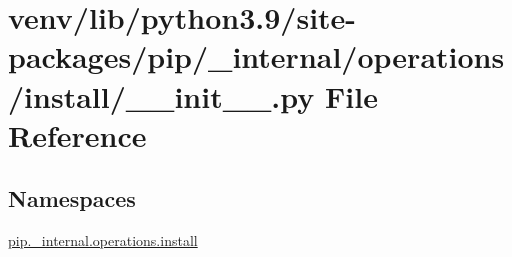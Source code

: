 \hypertarget{venv_2lib_2python3_89_2site-packages_2pip_2__internal_2operations_2install_2____init_____8py}{}\section{venv/lib/python3.9/site-\/packages/pip/\+\_\+internal/operations/install/\+\_\+\+\_\+init\+\_\+\+\_\+.py File Reference}
\label{venv_2lib_2python3_89_2site-packages_2pip_2__internal_2operations_2install_2____init_____8py}
\subsection*{Namespaces}
\begin{DoxyCompactItemize}
\item 
 \hyperlink{namespacepip_1_1__internal_1_1operations_1_1install}{pip.\+\_\+internal.\+operations.\+install}
\end{DoxyCompactItemize}
